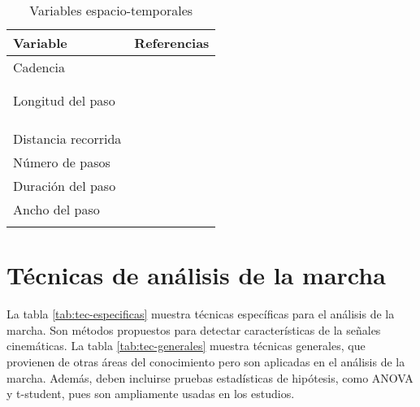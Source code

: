 \begin{table}
    \centering
    \caption{Variables espacio-temporales}
    \label{tab:espacio-temp}
    \begin{tabular}{ll}
        \toprule
        Variable & Referencias \\
        \midrule
        Cadencia & \cite{menz, cuaya, franklin} \\
                 & \cite{muro, lei, prakash} \\
                 & \cite{flora, latt, mazza} \\
        Longitud del paso & \cite{menz,franklin, mizoguchi} \\
                   & \cite{forneris, lei, yang2} \\
                   & \cite{prakash, latt, punt} \\
                   & \cite{bruijn} \\
         Distancia recorrida & \cite{cuaya, muro}  \\
         Número de pasos & \cite{cuaya} \\
         Duración del paso & \cite{cuaya, forneris} \\
         Ancho del paso & \cite{muro, yang2, flora} \\
                        & \cite{punt, choi} \\
        \bottomrule
    \end{tabular}
\end{table}

\section[Técnicas]{Técnicas de análisis de la marcha}

La tabla \ref{tab:tec-especificas} muestra técnicas específicas para el análisis de la marcha. Son métodos propuestos para detectar características de la señales cinemáticas. La tabla \ref{tab:tec-generales} muestra técnicas generales, que provienen de otras áreas del conocimiento pero son aplicadas en el análisis de la marcha. Además, deben incluirse pruebas estadísticas de hipótesis, como ANOVA y t-student, pues son ampliamente usadas en los estudios.

